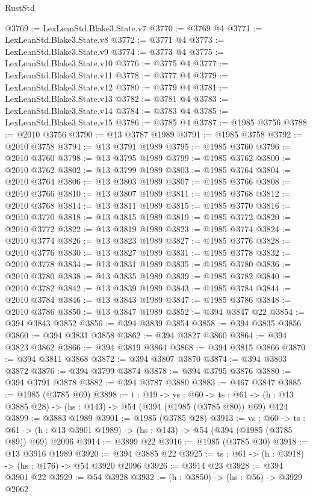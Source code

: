 \begin{lexlean}{RustStd}
\begin{coremodule}
{\begin{coremodule}
{{{{{{{{{{@3769 := LexLeanStd.Blake3.State.v7
@3770 := @3769 @4
@3771 := LexLeanStd.Blake3.State.v8
@3772 := @3771 @4
@3773 := LexLeanStd.Blake3.State.v9
@3774 := @3773 @4
@3775 := LexLeanStd.Blake3.State.v10
@3776 := @3775 @4
@3777 := LexLeanStd.Blake3.State.v11
@3778 := @3777 @4
@3779 := LexLeanStd.Blake3.State.v12
@3780 := @3779 @4
@3781 := LexLeanStd.Blake3.State.v13
@3782 := @3781 @4
@3783 := LexLeanStd.Blake3.State.v14
@3784 := @3783 @4
@3785 := LexLeanStd.Blake3.State.v15
@3786 := @3785 @4
@3787 := @1985 @3756
@3788 := @2010 @3756
@3790 := @13 @3787 @1989
@3791 := @1985 @3758
@3792 := @2010 @3758
@3794 := @13 @3791 @1989
@3795 := @1985 @3760
@3796 := @2010 @3760
@3798 := @13 @3795 @1989
@3799 := @1985 @3762
@3800 := @2010 @3762
@3802 := @13 @3799 @1989
@3803 := @1985 @3764
@3804 := @2010 @3764
@3806 := @13 @3803 @1989
@3807 := @1985 @3766
@3808 := @2010 @3766
@3810 := @13 @3807 @1989
@3811 := @1985 @3768
@3812 := @2010 @3768
@3814 := @13 @3811 @1989
@3815 := @1985 @3770
@3816 := @2010 @3770
@3818 := @13 @3815 @1989
@3819 := @1985 @3772
@3820 := @2010 @3772
@3822 := @13 @3819 @1989
@3823 := @1985 @3774
@3824 := @2010 @3774
@3826 := @13 @3823 @1989
@3827 := @1985 @3776
@3828 := @2010 @3776
@3830 := @13 @3827 @1989
@3831 := @1985 @3778
@3832 := @2010 @3778
@3834 := @13 @3831 @1989
@3835 := @1985 @3780
@3836 := @2010 @3780
@3838 := @13 @3835 @1989
@3839 := @1985 @3782
@3840 := @2010 @3782
@3842 := @13 @3839 @1989
@3843 := @1985 @3784
@3844 := @2010 @3784
@3846 := @13 @3843 @1989
@3847 := @1985 @3786
@3848 := @2010 @3786
@3850 := @13 @3847 @1989
@3852 := @394 @3847 @22
@3854 := @394 @3843 @3852
@3856 := @394 @3839 @3854
@3858 := @394 @3835 @3856
@3860 := @394 @3831 @3858
@3862 := @394 @3827 @3860
@3864 := @394 @3823 @3862
@3866 := @394 @3819 @3864
@3868 := @394 @3815 @3866
@3870 := @394 @3811 @3868
@3872 := @394 @3807 @3870
@3874 := @394 @3803 @3872
@3876 := @394 @3799 @3874
@3878 := @394 @3795 @3876
@3880 := @394 @3791 @3878
@3882 := @394 @3787 @3880
@3883 := @467 @3847
@3885 := @1985 (@3785 @69)
@3898 := {t : @19} ->
  {vs : @60} ->
  {ts : @61} -> (h : @13 @3885 @28) -> (hs : @143) -> @54 (@394 (@1985 (@3785 @80)) @69) @424
@3899 := @3883 @1989
@3901 := @1985 (@3785 @28)
@3913 := {vs : @60} ->
  {ts : @61} -> (h : @13 @3901 @1989) -> (hs : @143) -> @54 (@394 (@1985 (@3785 @89)) @69) @2096
@3914 := @3899 @22
@3916 := @1985 (@3785 @30)
@3918 := @13 @3916 @1989
@3920 := @394 @3885 @22
@3925 := {ts : @61} -> (h : @3918) -> (hs : @176) -> @54 @3920 @2096
@3926 := @3914 @23
@3928 := @394 @3901 @22
@3929 := @54 @3928
@3932 := (h : @3850) -> (hs : @56) -> @3929 @2062
}}}}}}}}}}
\end{coremodule}}
\end{coremodule}
\end{lexlean}
